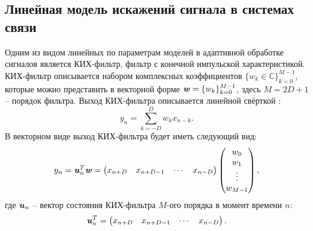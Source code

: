 \subsection{Линейная модель искажений сигнала в системах связи}
\label{sec:fir_descript}
Одним из видом линейных по параметрам моделей в адаптивной обработке сигналов является КИХ-фильтр, фильтр с конечной импульской характеристикой. КИХ-фильтр описывается набором комплексных коэффициентов $\{w_k \in \mathbb{C}\}_{k=0}^{M-1}$, которые можно представить в векторной форме $\textbf{\textit{w}}=\{w_k\}_{k=0}^{M-1}$, здесь $M=2D+1$ -- порядок фильтра. Выход КИХ-фильтра описывается линейной свёрткой \cite{dsp_layons}:
\begin{equation}
	y_n=\sum_{k=-D}^{D}w_kx_{n-k}.
	\label{lin_conv}
\end{equation}
В векторном виде выход КИХ-фильтра будет иметь следующий вид:
\begin{equation}
	y_n=\textbf{\textit{u}}_{n}^{T}\textbf{\textit{w}}=
	\begin{pmatrix} x_{n+D} & x_{n+D-1} & \cdots &  x_{n-D }\end{pmatrix}\begin{pmatrix} w_0 \\ w_1 \\ \vdots \\ w_{M-1}\end{pmatrix},
	\label{lin_conv_vect}
\end{equation}
где $\textbf{\textit{u}}_{n}$ -- вектор состояния КИХ-фильтра $M$-ого порядка в момент времени $n$:
\begin{equation}
	\textbf{\textit{u}}_{n}^{T}=
	\begin{pmatrix} x_{n+D} & x_{n+D-1} & \cdots &  x_{n-D}\end{pmatrix}.
	\label{fir_state_vec}
\end{equation}

